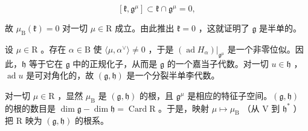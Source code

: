 \[
[ \mathfrak {k}, \mathfrak {g} ^ {\mu} ] \subset \mathfrak {k} \cap \mathfrak {g} ^ {\mu} = 0,
\]

故 \(\mu_{\mathrm{B}}(\mathfrak{k}) = 0\) 对一切 \(\mu \in \mathrm{R}\) 成立。由此推出 \(\mathfrak{k} = 0\) ，这就证明了 \(\mathfrak{g}\) 是半单的。

设 \(\mu \in \mathrm{R}\) 。存在 \(\alpha \in \mathrm{B}\) 使 \(\langle \mu, \alpha^{\vee} \rangle \neq 0\) ，于是 \((\operatorname{ad} H_{\alpha})|_{\mathfrak{g}^{\mu}}\) 是一个非零位似。因此，\(\mathfrak{h}\) 等于它在 \(\mathfrak{g}\) 中的正规化子，从而是 \(\mathfrak{g}\) 的一个嘉当子代数。对一切 \(u \in \mathfrak{h}\) ，\(\operatorname{ad} u\) 是可对角化的，故 \((\mathfrak{g}, \mathfrak{h})\) 是一个分裂半单李代数。

对一切 \(\mu \in \mathrm{R}\) ，显然 \(\mu_{\mathrm{B}}\) 是 \((\mathfrak{g},\mathfrak{h})\) 的根，且 \(\mathfrak{g}^{\mu}\) 是相应的特征子空间。\((\mathfrak{g},\mathfrak{h})\) 的根的数目是 \(\dim \mathfrak{g} - \dim \mathfrak{h} = \operatorname{Card}\mathrm{R}\) 。于是，映射 \(\mu \mapsto \mu_{\mathrm{B}}\) （从 V 到 \(\mathfrak{h}^*\) ）把 R 映为 \((\mathfrak{g},\mathfrak{h})\) 的根系。


